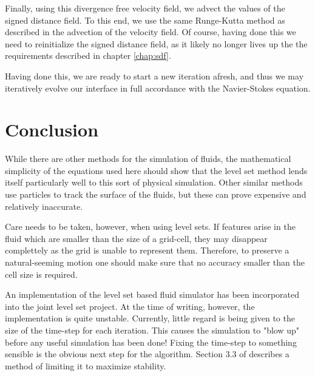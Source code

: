 Finally, using this divergence free velocity field, we advect the
values of the signed distance field. To this end, we use the same
Runge-Kutta method as described in the advection of the velocity
field. Of course, having done this we need to reinitialize the signed
distance field, as it likely no longer lives up the the requirements
described in chapter \vref{chap:sdf}.

Having done this, we are ready to start a new iteration afresh, and
thus we may iteratively evolve our interface in full accordance with
the Navier-Stokes equation.

\section{Conclusion}
While there are other methods for the simulation of fluids, the
mathematical simplicity of the equations used here should show that
the level set method lends itself particularly well to this sort of
physical simulation. Other similar methods use particles to track the
surface of the fluids, but these can prove expensive and relatively
inaccurate.

Care needs to be taken, however, when using level sets. If features
arise in the fluid which are smaller than the size of a grid-cell,
they may disappear complettely as the grid is unable to represent
them. Therefore, to preserve a natural-seeming motion one should make
sure that no accuracy smaller than the cell size is required.

An implementation of the level set based fluid simulator has been
incorporated into the joint level set project. At the time of writing,
however, the implementation is quite unstable. Currently, little
regard is being given to the size of the time-step for each
iteration. This causes the simulation to "blow up" before any useful
simulation has been done! Fixing the time-step to something sensible
is the obvious next step for the algorithm. Section 3.3 of
 describes a method of limiting it to maximize
stability.

